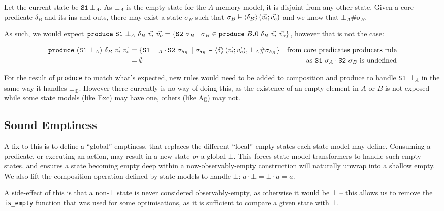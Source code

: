 \documentclass[,a4paper,oneside]{article}
\newcommand{\code}[1]{\texttt{#1}}
\begin{document}
Let the current state be $\code{S1}~\bot_A$. As $\bot_A$ is the empty state for the $A$ memory model, it is disjoint from any other state. Given a core predicate $\delta_B$ and its ins and outs, there may exist a state $\sigma_B$ such that $\sigma_B\vDash \left<\texttt{$\delta_B$}\right>(\vec{v_i};\vec{v_o})$ and we know that $\bot_A \# \sigma_B$. 

As such, we would expect $\code{produce}~\code{S1}~\bot_A~\delta_B~\ins~\outs = \{\code{S2}~\sigma_B~|~\sigma_B\in \code{produce}~B.0~ \delta_B~\ins~\outs \}$, however that is not the case:

\begin{align*}
	\code{produce}~(\code{S1}~\bot_A)~\delta_B~\ins~\outs
	&=\{\code{S1}~\bot_A\cdot\code{S2}~\sigma_{\delta_B}~|~\sigma_{\delta_B}\vDash\corepred{$\delta$}{\ins}{\outs},\bot_A\#\sigma_{\delta_B}\}&\text{from core predicates producers rule}\\
	&=\emptyset &\text{as }\code{S1}~\sigma_A\cdot\code{S2}~\sigma_B\text{ is undefined}
\end{align*}

For the result of \code{produce} to match what's expected, new rules would need to be added to composition and produce to handle \code{S1~$\bot_A$} in the same way it handles $\bot_\oplus$. However there currently is no way of doing this, as the existence of an empty element in $A$ or $B$ is not exposed -- while some state models (like Exc) may have one, others (like Ag) may not.

\subsection{Sound Emptiness}

A fix to this is to define a ``global'' emptiness, that replaces the different ``local'' empty states each state model may define. Consuming a predicate, or executing an action, may result in a new state {\it or} a global $\bot$. This forces state model transformers to handle such empty states, and ensures a state becoming empty deep within a now-observably-empty construction will naturally unwrap into a shallow empty. We also lift the composition operation defined by state models to handle $\bot$: $a \cdot \bot = \bot \cdot a = a$.

A side-effect of this is that a non-$\bot$ state is never considered observably-empty, as otherwise it would be $\bot$ -- this allows us to remove the \code{is\_empty} function that was used for some optimisations, as it is sufficient to compare a given state with $\bot$.
\end{document}
